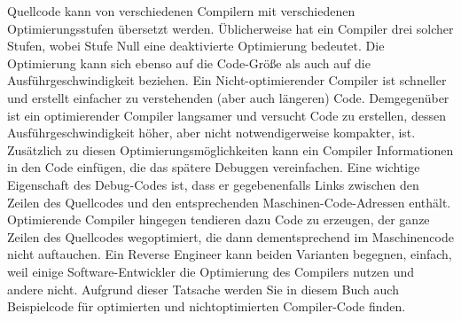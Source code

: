 Quellcode kann von verschiedenen Compilern mit verschiedenen Optimierungsstufen übersetzt werden.
Üblicherweise hat ein Compiler drei solcher Stufen, wobei Stufe Null eine deaktivierte Optimierung bedeutet.
Die Optimierung kann sich ebenso auf die Code-Größe als auch auf die Ausführgeschwindigkeit beziehen.
Ein Nicht-optimierender Compiler ist schneller und erstellt einfacher zu verstehenden (aber auch längeren) Code.
Demgegenüber ist ein optimierender Compiler langsamer und versucht Code zu erstellen, dessen Ausführgeschwindigkeit
höher, aber nicht notwendigerweise kompakter, ist.
Zusätzlich zu diesen Optimierungsmöglichkeiten kann ein Compiler Informationen in den Code einfügen, die das spätere
Debuggen vereinfachen.
Eine wichtige Eigenschaft des Debug-Codes ist, dass er gegebenenfalls Links zwischen den Zeilen des Quellcodes und
den entsprechenden Maschinen-Code-Adressen enthält.
Optimierende Compiler hingegen tendieren dazu Code zu erzeugen, der ganze Zeilen des Quellcodes wegoptimiert, die dann
dementsprechend im Maschinencode nicht auftauchen.
Ein Reverse Engineer kann beiden Varianten begegnen, einfach, weil einige Software-Entwickler die Optimierung des Compilers
nutzen und andere nicht. Aufgrund dieser Tatsache werden Sie in diesem Buch auch Beispielcode für optimierten und
nichtoptimierten Compiler-Code finden.
